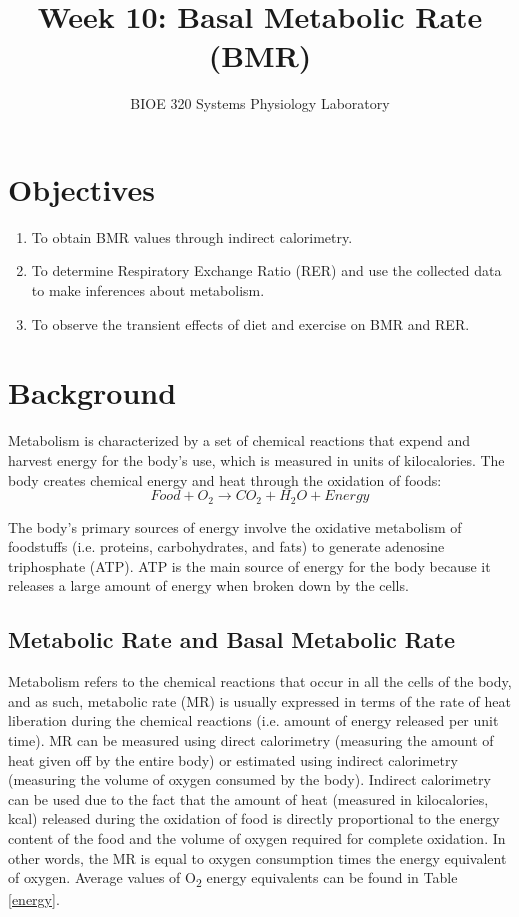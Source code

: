 \documentclass{article}
\title{Week 10: Basal Metabolic Rate (BMR)}
\author{BIOE 320 Systems Physiology Laboratory}
\date{}
\begin{document}
\large
\maketitle

\section*{Objectives}
\begin{enumerate}
	\item To obtain BMR values through indirect calorimetry.
	\item To determine Respiratory Exchange Ratio (RER) and use the collected data to make inferences about metabolism.
	\item To observe the transient effects of diet and exercise on BMR and RER.
\end{enumerate}

\section*{Background}
Metabolism is characterized by a set of chemical reactions that expend and harvest energy for the body's use, which is measured in units of kilocalories. The body creates chemical energy and heat through the oxidation of foods:
\begin{equation}
	Food + O_2 \rightarrow CO_2 + H_2O + Energy
\end{equation}

The body's primary sources of energy involve the oxidative metabolism of foodstuffs (i.e. proteins, carbohydrates, and fats) to generate adenosine triphosphate (ATP). ATP is the main source of energy for the body because it releases a large amount of energy when broken down by the cells.

\subsection*{Metabolic Rate and Basal Metabolic Rate}

Metabolism refers to the chemical reactions that occur in all the cells of the body, and as such, metabolic rate (MR) is usually expressed in terms of the rate of heat liberation during the chemical reactions (i.e. amount of energy released per unit time). MR can be measured using direct calorimetry (measuring the amount of heat given off by the entire body) or estimated using indirect calorimetry (measuring the volume of oxygen consumed by the body). Indirect calorimetry can be used due to the fact that the amount of heat (measured in kilocalories, kcal) released during the oxidation of food is directly proportional to the energy content of the food and the volume of oxygen required for complete oxidation. In other words, the MR is equal to oxygen consumption times the energy equivalent of oxygen. Average values of O\textsubscript{2} energy equivalents can be found in Table \ref{energy}.
\end{document}
